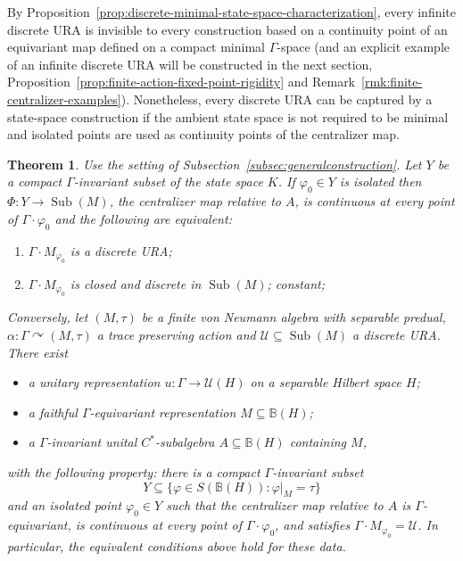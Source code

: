 \documentclass[12pt]{amsart} %
\theoremstyle{plain}
\newtheorem{theorem}{Theorem}[section]
\theoremstyle{definition}
\newcommand{\B}{\mathbb{B}}
\newcommand{\Ucal}{\mathcal{U}}
\DeclareMathOperator{\Sub}{Sub}
\begin{document}
\fi
\medskip
\noindent By
Proposition~\ref{prop:discrete-minimal-state-space-characterization}, every
infinite discrete URA is invisible to every construction based on a
continuity point of an equivariant map defined on a compact minimal
$\Gamma$-space (and an explicit example of an infinite
discrete URA will be constructed in the next section, Proposition~\ref{prop:finite-action-fixed-point-rigidity} and Remark~\ref{rmk:finite-centralizer-examples}). Nonetheless, every discrete URA can be captured by a
state-space construction if the ambient state space is not required to be
minimal and isolated points are used as continuity points of the centralizer
map.
\begin{theorem}
\label{thm:discrete-uras}
Use the setting of Subsection~\ref{subsec:generalconstruction}. Let
$Y$ be a compact $\Gamma$-invariant subset of the state space $K$. If
$\varphi_0\in Y$ is isolated then $\Phi:Y\to\Sub(M)$, the centralizer
map relative to $A$, is continuous at every point of
$\Gamma\cdot\varphi_0$ and the following are equivalent:
\begin{enumerate}
\item $\Gamma\cdot M_{\varphi_0}$ is a discrete URA;
\item $\Gamma\cdot M_{\varphi_0}$ is closed and discrete in $\Sub(M)$;
constant;
\end{enumerate}
\medskip
\noindent Conversely, let $(M,\tau)$ be a finite von Neumann algebra with separable
predual, $\alpha:\Gamma\curvearrowright(M,\tau)$ a trace preserving action and $\mathcal U\subseteq\Sub(M)$ a discrete URA. There exist
\begin{itemize}
\item a unitary representation $u:\Gamma\to\Ucal(H)$ on a
separable Hilbert space $H$;
\item a faithful $\Gamma$-equivariant representation
$M\subseteq\B(H)$;
\item a $\Gamma$-invariant unital $C^*$-subalgebra
$A\subseteq\B(H)$ containing $M$,
\end{itemize}
with the following property: there is a compact $\Gamma$-invariant subset
$$Y\subseteq\{\varphi\in S(\B(H)):\varphi|_M=\tau\}$$
and an isolated point $\varphi_0\in Y$ such that the centralizer map
relative to $A$ is $\Gamma$-equivariant, is continuous at every point of
$\Gamma\cdot\varphi_0$, and satisfies
$\Gamma\cdot M_{\varphi_0}=\mathcal U$. In particular, the equivalent conditions above hold for these data.
\end{theorem}
\end{document}

